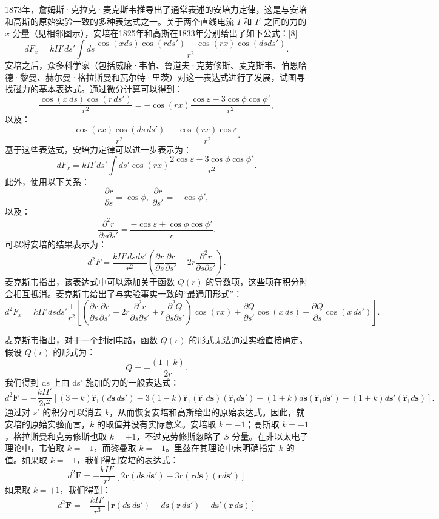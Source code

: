 1873年，詹姆斯·克拉克·麦克斯韦推导出了通常表述的安培力定律，这是与安培和高斯的原始实验一致的多种表达式之一。关于两个直线电流 \(I\) 和 \(I'\) 之间的力的 \(x\) 分量（见相邻图示），安培在1825年和高斯在1833年分别给出了如下公式：[8]
\[
dF_x = kII' ds' \int ds \frac{\cos(x ds) \cos(r ds') - \cos(rx) \cos(ds ds')}{r^2}.~
\]
安培之后，众多科学家（包括威廉·韦伯、鲁道夫·克劳修斯、麦克斯韦、伯恩哈德·黎曼、赫尔曼·格拉斯曼和瓦尔特·里茨）对这一表达式进行了发展，试图寻找磁力的基本表达式。通过微分计算可以得到：
\[
\frac{\cos(x\,ds) \cos(r\,ds')}{r^2} = -\cos(rx) \frac{\cos \varepsilon - 3 \cos \phi \cos \phi'}{r^2},~
\]
以及：
\[
\frac{\cos(rx) \cos(ds\,ds')}{r^2} = \frac{\cos(rx) \cos \varepsilon}{r^2}.~
\]
基于这些表达式，安培力定律可以进一步表示为：
\[
dF_x = kII' ds' \int ds' \cos(rx) \frac{2 \cos \varepsilon - 3 \cos \phi \cos \phi'}{r^2}.~
\]
此外，使用以下关系：
\[
\frac{\partial r}{\partial s} = \cos \phi,\ \frac{\partial r}{\partial s'} = -\cos \phi',~
\]
以及：
\[
\frac{\partial^2 r}{\partial s \partial s'} = \frac{-\cos \varepsilon + \cos \phi \cos \phi'}{r}.~
\]
可以将安培的结果表示为：
\[
d^2F = \frac{kII' ds ds'}{r^2} \left( \frac{\partial r}{\partial s} \frac{\partial r}{\partial s'} - 2r \frac{\partial^2 r}{\partial s \partial s'} \right).~
\]
麦克斯韦指出，该表达式中可以添加关于函数 \(Q(r)\) 的导数项，这些项在积分时会相互抵消。麦克斯韦给出了与实验事实一致的“最通用形式”：
\[
d^2F_x = kII' ds ds' \frac{1}{r^2} \left[ \left( \frac{\partial r}{\partial s} \frac{\partial r}{\partial s'} - 2r \frac{\partial^2 r}{\partial s \partial s'} + r \frac{\partial^2 Q}{\partial s \partial s'} \right) \cos(rx) + \frac{\partial Q}{\partial s'} \cos(x\,ds) - \frac{\partial Q}{\partial s} \cos(x\,ds') \right].~
\]

麦克斯韦指出，对于一个封闭电路，函数 \(Q(r)\) 的形式无法通过实验直接确定。假设 \(Q(r)\) 的形式为：
\[
Q = -\frac{(1+k)}{2r}.~
\]
我们得到 ds 上由 ds' 施加的力的一般表达式：
\[
d^{2}\mathbf{F} = -\frac{kII'}{2r^{2}} \left[ \left(3-k\right)\hat{\mathbf{r}}_{1}\left(d\mathbf{s} \, d\mathbf{s}'\right) - 3\left(1-k\right)\hat{\mathbf{r}}_{1}\left(\hat{\mathbf{r}}_{1} d\mathbf{s}\right)\left(\hat{\mathbf{r}}_{1} d\mathbf{s}'\right) - \left(1+k\right)d\mathbf{s}\left(\hat{\mathbf{r}}_{1} d\mathbf{s}'\right) - \left(1+k\right)d\mathbf{s}'\left(\hat{\mathbf{r}}_{1} d\mathbf{s}\right) \right].~
\]
通过对 \(s'\) 的积分可以消去 \(k\)，从而恢复安培和高斯给出的原始表达式。因此，就安培的原始实验而言，\(k\) 的取值并没有实际意义。安培取 \(k = -1\)；高斯取 \(k = +1\)，格拉斯曼和克劳修斯也取 \(k = +1\)，不过克劳修斯忽略了 \(S\) 分量。在非以太电子理论中，韦伯取 \(k = -1\)，而黎曼取 \(k = +1\)。里兹在其理论中未明确指定 \(k\) 的值。如果取 \(k = -1\)，我们得到安培的表达式：
\[
d^{2}\mathbf{F} = -\frac{kII'}{r^{3}}\left[2\mathbf{r}(d\mathbf{s} \, d\mathbf{s'}) - 3\mathbf{r}(\mathbf{r} d\mathbf{s})(\mathbf{r} d\mathbf{s'})\right]~
\]
如果取 \(k=+1\)，我们得到：
\[
d^{2}\mathbf{F} = -\frac{kII'}{r^{3}}\left[\mathbf{r}(d\mathbf{s} \, d\mathbf{s'}) - d\mathbf{s}(\mathbf{r} \, d\mathbf{s'}) - d\mathbf{s'}(\mathbf{r} \, d\mathbf{s})\right]~
\]

